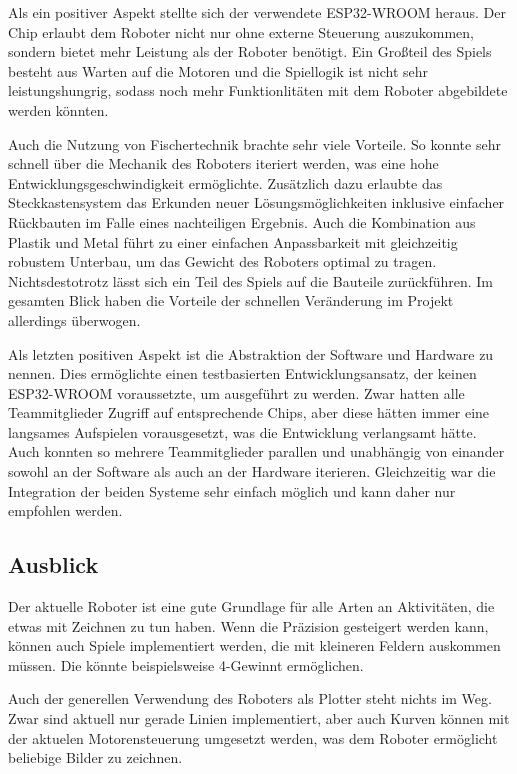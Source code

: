 \documentclass[conference,compsoc,final,a4paper]{IEEEtran}
\begin{document}
Als ein positiver Aspekt stellte sich der verwendete ESP32-WROOM heraus. Der Chip erlaubt dem Roboter nicht nur ohne externe Steuerung
auszukommen, sondern bietet mehr Leistung als der Roboter benötigt. Ein Großteil des Spiels besteht aus Warten auf die Motoren und die
Spiellogik ist nicht sehr leistungshungrig, sodass noch mehr Funktionlitäten mit dem Roboter abgebildete werden könnten.

Auch die Nutzung von Fischertechnik brachte sehr viele Vorteile. So konnte sehr schnell über die Mechanik des Roboters iteriert werden,
was eine hohe Entwicklungsgeschwindigkeit ermöglichte. Zusätzlich dazu erlaubte das Steckkastensystem das Erkunden neuer Lösungsmöglichkeiten
inklusive einfacher Rückbauten im Falle eines nachteiligen Ergebnis. Auch die Kombination aus Plastik und Metal führt zu einer einfachen 
Anpassbarkeit mit gleichzeitig robustem Unterbau, um das Gewicht des Roboters optimal zu tragen. Nichtsdestotrotz lässt sich ein Teil des
Spiels auf die Bauteile zurückführen. Im gesamten Blick haben die Vorteile der schnellen Veränderung im Projekt allerdings überwogen.

Als letzten positiven Aspekt ist die Abstraktion der Software und Hardware zu nennen. Dies ermöglichte einen testbasierten
Entwicklungsansatz, der keinen ESP32-WROOM voraussetzte, um ausgeführt zu werden. Zwar hatten alle Teammitglieder Zugriff auf entsprechende
Chips, aber diese hätten immer eine langsames Aufspielen vorausgesetzt, was die Entwicklung verlangsamt hätte. Auch konnten so mehrere
Teammitglieder parallen und unabhängig von einander sowohl an der Software als auch an der Hardware iterieren. Gleichzeitig war die
Integration der beiden Systeme sehr einfach möglich und kann daher nur empfohlen werden.

\subsection{Ausblick}

Der aktuelle Roboter ist eine gute Grundlage für alle Arten an Aktivitäten, die etwas mit Zeichnen zu tun haben. Wenn die Präzision
gesteigert werden kann, können auch Spiele implementiert werden, die mit kleineren Feldern auskommen müssen. Die könnte beispielsweise
4-Gewinnt ermöglichen.

Auch der generellen Verwendung des Roboters als Plotter steht nichts im Weg. Zwar sind aktuell nur gerade Linien implementiert, aber
auch Kurven können mit der aktuelen Motorensteuerung umgesetzt werden, was dem Roboter ermöglicht beliebige Bilder zu zeichnen.

\printbibliography
\end{document}
